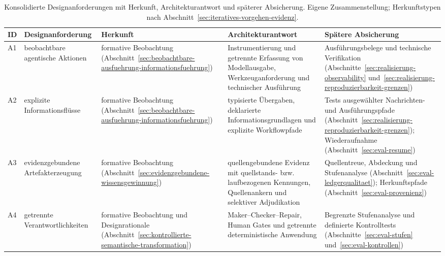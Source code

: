 \begin{table}[tbp]
\centering
\caption[Konsolidierte Designanforderungen A1--A10]{Konsolidierte
Designanforderungen mit Herkunft, Architekturantwort und späterer
Absicherung. Eigene Zusammenstellung; Herkunftstypen nach
Abschnitt~\ref{sec:iteratives-vorgehen-evidenz}.}
\label{t:designanforderungen-a1-a10}
\scriptsize
\setlength{\tabcolsep}{3pt}
\renewcommand{\arraystretch}{1.2}
\begin{tabularx}{\textwidth}{
    >{\raggedright\arraybackslash}p{}
    >{\raggedright\arraybackslash}p{}
    >{\raggedright\arraybackslash}p{}
    >{\raggedright\arraybackslash}X
    >{\raggedright\arraybackslash}p{}
}
\toprule
\textbf{ID} & \textbf{Designanforderung} & \textbf{Herkunft} &
\textbf{Architekturantwort} & \textbf{Spätere Absicherung} \\
\midrule
A1 & beobachtbare agentische Aktionen & formative Beobachtung
(Abschnitt~\ref{sec:beobachtbare-ausfuehrung-informationsfuehrung}) &
Instrumentierung und getrennte Erfassung von Modellausgabe,
Werkzeuganforderung und technischer Ausführung &
Ausführungsbelege und technische Verifikation
(Abschnitte~\ref{sec:realisierung-observability}
und~\ref{sec:realisierung-reproduzierbarkeit-grenzen}) \\
\addlinespace[0.3em]
A2 & explizite Informationsflüsse & formative Beobachtung
(Abschnitt~\ref{sec:beobachtbare-ausfuehrung-informationsfuehrung}) &
typisierte Übergaben, deklarierte Informationsgrundlagen und explizite
Workflowpfade &
Tests ausgewählter Nachrichten- und Ausführungspfade
(Abschnitt~\ref{sec:realisierung-reproduzierbarkeit-grenzen});
Wiederaufnahme (Abschnitt~\ref{sec:eval-resume}) \\
\addlinespace[0.3em]
A3 & evidenzgebundene Artefakterzeugung & formative Beobachtung
(Abschnitt~\ref{sec:evidenzgebundene-wissensgewinnung}) &
quellengebundene Evidenz mit quellstands- bzw. laufbezogenen Kennungen, Quellenankern und
selektiver Adjudikation &
Quellentreue, Abdeckung und Stufenanalyse
(Abschnitt~\ref{sec:eval-ledgerqualitaet}); Herkunftspfade
(Abschnitt~\ref{sec:eval-provenienz}) \\
\addlinespace[0.3em]
A4 & getrennte Verantwortlichkeiten & formative Beobachtung und
Designrationale
(Abschnitt~\ref{sec:kontrollierte-semantische-transformation}) &
Maker--Checker--Repair, Human Gates und getrennte deterministische
Anwendung &
Begrenzte Stufenanalyse und definierte Kontrolltests
(Abschnitte~\ref{sec:eval-stufen} und~\ref{sec:eval-kontrollen}) \\

\end{tabularx}
\end{table}
